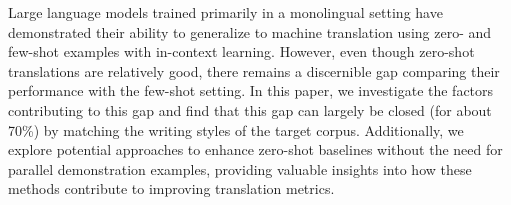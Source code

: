 Large language models trained primarily in a monolingual setting have demonstrated their ability to generalize to machine translation using zero- and few-shot examples with in-context learning. However, even though zero-shot translations are relatively good, there remains a discernible gap comparing their performance with the few-shot setting. In this paper, we investigate the factors contributing to this gap and find that this gap can largely be closed (for about 70\%) by matching the writing styles of the target corpus. Additionally, we explore potential approaches to enhance zero-shot baselines without the need for parallel demonstration examples, providing valuable insights into how these methods contribute to improving translation metrics.